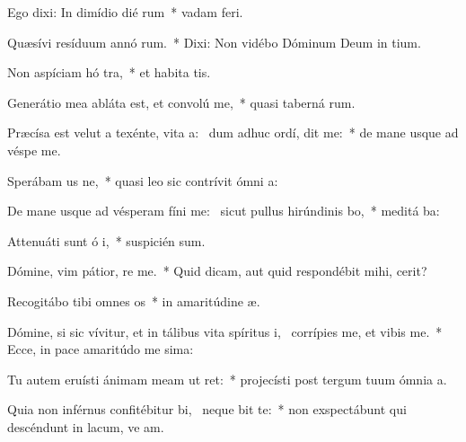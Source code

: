 \item Ego dixi: In dimídio dié rum~* vadam   feri.
\item Quæsívi resíduum annó rum.~* Dixi: Non vidébo Dóminum Deum in  tium.
\item Non aspíciam hó tra,~* et habita tis.
\item Generátio mea abláta est, et convolú   me,~* quasi taberná rum.
\item Præcísa est velut a texénte, vita a:~\pscross{} dum adhuc ordí, dit me:~* de mane usque ad véspe  me.
\item Sperábam us  ne,~* quasi leo sic contrívit ómni  a:
\item De mane usque ad vésperam fíni me:~\pscross{} sicut pullus hirúndinis  bo,~* meditá  ba:
\item Attenuáti sunt ó i,~* suspicién  sum.
\item Dómine, vim pátior, re  me.~* Quid dicam, aut quid respondébit mihi,   cerit?
\item Recogitábo tibi omnes  os~* in amaritúdine  æ.
\item Dómine, si sic vívitur, et in tálibus vita spíritus i,~\pscross{} corrípies me, et vibis me.~* Ecce, in pace amaritúdo me sima:
\item Tu autem eruísti ánimam meam ut  ret:~* projecísti post tergum tuum ómnia  a.
\item Quia non inférnus confitébitur bi,~\pscross{} neque  bit te:~* non exspectábunt qui descéndunt in lacum, ve am.
